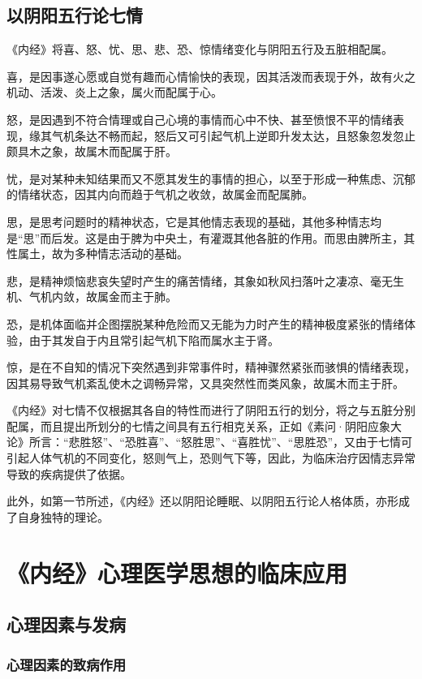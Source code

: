 \documentclass[12pt]{ctexbook}
\begin{document}
\subsection{以阴阳五行论七情}%

《内经》将喜、怒、忧、思、悲、恐、惊情绪变化与阴阳五行及五脏相配属。

喜，是因事遂心愿或自觉有趣而心情愉快的表现，因其活泼而表现于外，故有火之机动、活泼、炎上之象，属火而配属于心。

怒，是因遇到不符合情理或自己心境的事情而心中不快、甚至愤恨不平的情绪表现，缘其气机条达不畅而起，怒后又可引起气机上逆即升发太达，且怒象忽发忽止颇具木之象，故属木而配属于肝。

忧，是对某种未知结果而又不愿其发生的事情的担心，以至于形成一种焦虑、沉郁的情绪状态，因其内向而趋于气机之收敛，故属金而配属肺。

思，是思考问题时的精神状态，它是其他情志表现的基础，其他多种情志均是“思”而后发。这是由于脾为中央土，有灌溉其他各脏的作用。而思由脾所主，其性属土，故为多种情志活动的基础。

悲，是精神烦恼悲哀失望时产生的痛苦情绪，其象如秋风扫落叶之凄凉、毫无生机、气机内敛，故属金而主于肺。

恐，是机体面临并企图摆脱某种危险而又无能为力时产生的精神极度紧张的情绪体验，由于其发自于内且常引起气机下陷而属水主于肾。

惊，是在不自知的情况下突然遇到非常事件时，精神骤然紧张而骇惧的情绪表现，因其易导致气机紊乱使木之调畅异常，又具突然性而类风象，故属木而主于肝。

《内经》对七情不仅根据其各自的特性而进行了阴阳五行的划分，将之与五脏分别配属，而且提出所划分的七情之间具有五行相克关系，正如《素问·阴阳应象大论》所言：“悲胜怒”、“恐胜喜”、“怒胜思”、“喜胜忧”、“思胜恐”，又由于七情可引起人体气机的不同变化，怒则气上，恐则气下等，因此，为临床治疗因情志异常导致的疾病提供了依据。

此外，如第一节所述，《内经》还以阴阳论睡眠、以阴阳五行论人格体质，亦形成了自身独特的理论。

\section{《内经》心理医学思想的临床应用}%

\subsection{心理因素与发病}%

\subsubsection{心理因素的致病作用}%
\end{document}
